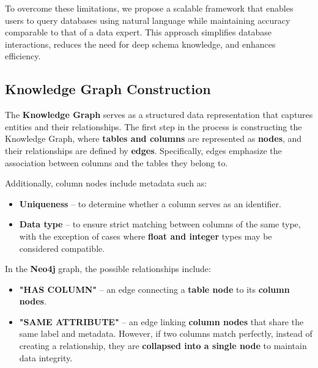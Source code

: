 To overcome these limitations, we propose a scalable framework that enables users to query databases using natural language while maintaining accuracy comparable to that of a data expert. This approach simplifies database interactions, reduces the need for deep schema knowledge, and enhances efficiency.

\subsection{Knowledge Graph Construction}
The \textbf{Knowledge Graph} serves as a structured data representation that captures entities and their relationships. The first step in the process is constructing the Knowledge Graph, where \textbf{tables and columns} are represented as \textbf{nodes}, and their relationships are defined by \textbf{edges}. Specifically, edges emphasize the association between columns and the tables they belong to.  

Additionally, column nodes include metadata such as:  
\begin{itemize}
    \item \textbf{Uniqueness} – to determine whether a column serves as an identifier.
    \item \textbf{Data type} – to ensure strict matching between columns of the same type, with the exception of cases where \textbf{float and integer} types may be considered compatible.
\end{itemize}

In the \textbf{Neo4j} graph, the possible relationships include:  
\begin{itemize}
    \item \textbf{"HAS COLUMN"} – an edge connecting a \textbf{table node} to its \textbf{column nodes}.
    \item \textbf{"SAME ATTRIBUTE"} – an edge linking \textbf{column nodes} that share the same label and metadata. However, if two columns match perfectly, instead of creating a relationship, they are \textbf{collapsed into a single node} to maintain data integrity.
\end{itemize}

